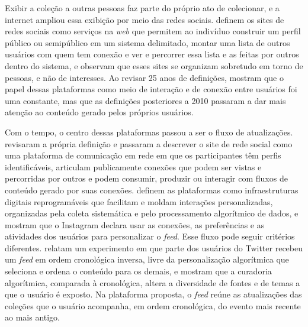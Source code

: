 Exibir a coleção a outras pessoas faz parte do próprio ato de colecionar, e a internet ampliou essa exibição por meio das redes sociais. 
definem os sites de redes sociais como serviços na \textit{web} que permitem ao indivíduo construir um perfil público ou semipúblico em um sistema delimitado,
montar uma lista de outros usuários com quem tem conexão e ver e percorrer essa lista e as feitas por outros dentro do sistema, e observam que esses sites se
organizam sobretudo em torno de pessoas, e não de interesses. Ao revisar 25 anos de definições,  mostram que o papel dessas
plataformas como meio de interação e de conexão entre usuários foi uma constante, mas que as definições posteriores a 2010 passaram a dar mais atenção ao
conteúdo gerado pelos próprios usuários.

Com o tempo, o centro dessas plataformas passou a ser o fluxo de atualizações.  revisaram a própria definição e passaram a
descrever o site de rede social como uma plataforma de comunicação em rede em que os participantes têm perfis identificáveis, articulam publicamente conexões
que podem ser vistas e percorridas por outros e podem consumir, produzir ou interagir com fluxos de conteúdo gerado por suas conexões. 
definem as plataformas como infraestruturas digitais reprogramáveis que facilitam e moldam interações personalizadas, organizadas pela coleta sistemática e
pelo processamento algorítmico de dados, e  mostram que o Instagram declara usar as conexões, as preferências e as atividades dos
usuários para personalizar o \textit{feed}. Esse fluxo pode seguir critérios diferentes.  relatam um experimento em que parte dos
usuários do Twitter recebeu um \textit{feed} em ordem cronológica inversa, livre da personalização algorítmica que seleciona e ordena o conteúdo para os
demais, e  mostram que a curadoria algorítmica, comparada à cronológica, altera a diversidade de fontes e de temas a que o
usuário é exposto. Na plataforma proposta, o \textit{feed} reúne as atualizações das coleções que o usuário acompanha, em ordem cronológica, do evento mais
recente ao mais antigo.

